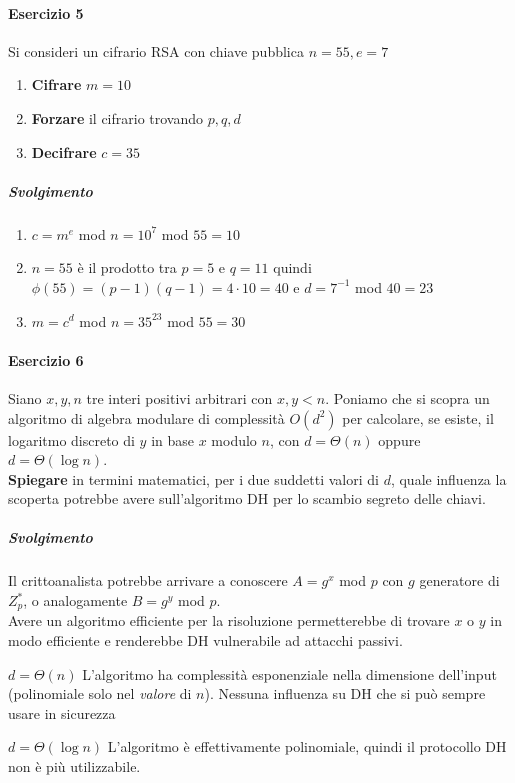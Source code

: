 \documentclass[10pt]{book}
\begin{document}
\paragraph{Esercizio 5} Si consideri un cifrario RSA con chiave pubblica $n = 55, e = 7$
\begin{enumerate}
	\item \textbf{Cifrare} $m = 10$
	\item \textbf{Forzare} il cifrario trovando $p,q,d$
	\item \textbf{Decifrare} $c = 35$
\end{enumerate}
\subparagraph{Svolgimento} \begin{enumerate}
	\item $c = m^e$ mod $n = 10^7$ mod $55 = 10$
	\item $n = 55$ è il prodotto tra $p = 5$ e $q = 11$ quindi $\phi(55) = (p-1)(q-1) = 4\cdot 10 = 40$ e $d = 7^{-1}$ mod $40 = 23$
	\item $m = c^d$ mod $n = 35^{23}$ mod $55 = 30$
\end{enumerate}

\paragraph{Esercizio 6} Siano $x,y,n$ tre interi positivi arbitrari con $x,y < n$. Poniamo che si scopra un algoritmo di algebra modulare di complessità $O(d^2)$ per calcolare, se esiste, il logaritmo discreto di $y$ in base $x$ modulo $n$, con $d = \Theta(n)$ oppure $d = \Theta(\log n)$.\\
\textbf{Spiegare} in termini matematici, per i due suddetti valori di $d$, quale influenza la scoperta potrebbe avere sull'algoritmo DH per lo scambio segreto delle chiavi.
\subparagraph{Svolgimento} Il crittoanalista potrebbe arrivare a conoscere $A = g^x$ mod $p$ con $g$ generatore di $Z_p^*$, o analogamente $B = g^y$ mod $p$.\\
Avere un algoritmo efficiente per la risoluzione permetterebbe di trovare $x$ o $y$ in modo efficiente e renderebbe DH vulnerabile ad attacchi passivi.\begin{list}{}{}
	\item[$d=\Theta(n)$] L'algoritmo ha complessità esponenziale nella dimensione dell'input (polinomiale solo nel \textit{valore} di $n$). Nessuna influenza su DH che si può sempre usare in sicurezza
	\item[$d=\Theta(\log n)$] L'algoritmo è effettivamente polinomiale, quindi il protocollo DH non è più utilizzabile.
\end{list}
\end{document}
